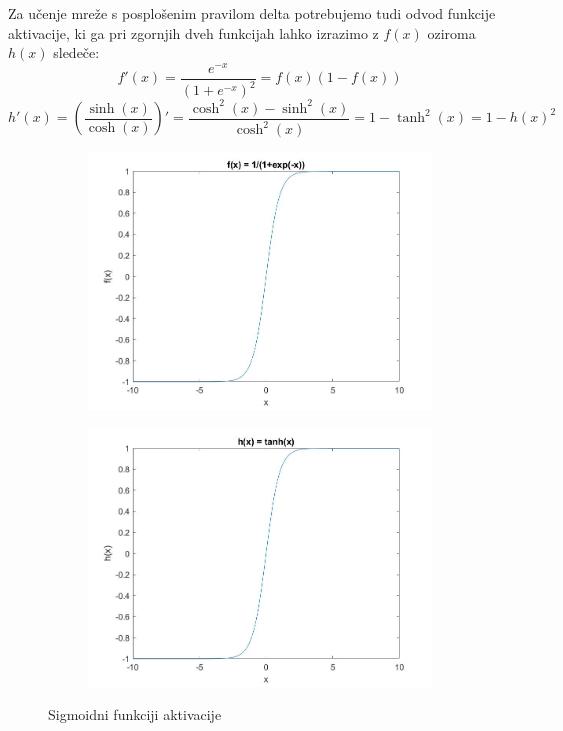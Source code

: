 \documentclass[mat1]{fmfdelo}
\begin{document}
Za učenje mreže s posplošenim pravilom delta potrebujemo tudi odvod funkcije aktivacije, ki ga pri zgornjih dveh funkcijah lahko izrazimo z $f(x)$ oziroma $h(x)$ sledeče:
%
\begin{equation}
f'(x) = \frac{e^{-x}}{(1+e^{-x})^2} = f(x)(1-f(x))
\end{equation}
%
\begin{equation}
h'(x) = \left(\frac{\sinh(x)}{\cosh(x)}\right)' = \frac{\cosh^2(x)- \sinh^2(x)}{\cosh^2(x)} = 1 - \tanh^2(x) = 1 - h(x)^2 
\end{equation}
%
\begin{figure}[!th]
\centering
\begin{subfigure}{.5\textwidth}
  \centering
  \includegraphics[width=.9\linewidth]{sig_exp.jpg}
\end{subfigure}%
\begin{subfigure}{.5\textwidth}
  \centering
  \includegraphics[width=.9\linewidth]{sig_tan.jpg}
\end{subfigure}
\caption{Sigmoidni funkciji aktivacije}
\label{fig:sigmoid}
\end{figure}
%
%
\\
\end{document}
